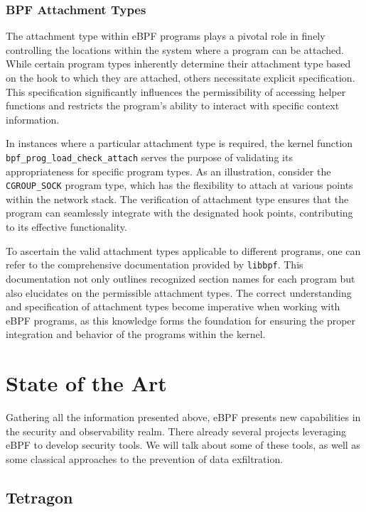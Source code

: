 \subsubsection{BPF Attachment Types}


The attachment type within eBPF programs plays a pivotal role in finely controlling the locations within the system where a program can be attached. While certain program types inherently determine their attachment type based on the hook to which they are attached, others necessitate explicit specification. This specification significantly influences the permissibility of accessing helper functions and restricts the program's ability to interact with specific context information.

In instances where a particular attachment type is required, the kernel function \texttt{bpf\_prog\_load\_check\_attach} serves the purpose of validating its appropriateness for specific program types. As an illustration, consider the \texttt{CGROUP\_SOCK} program type, which has the flexibility to attach at various points within the network stack. The verification of attachment type ensures that the program can seamlessly integrate with the designated hook points, contributing to its effective functionality.

To ascertain the valid attachment types applicable to different programs, one can refer to the comprehensive documentation provided by \texttt{libbpf}. This documentation not only outlines recognized section names for each program but also elucidates on the permissible attachment types. The correct understanding and specification of attachment types become imperative when working with eBPF programs, as this knowledge forms the foundation for ensuring the proper integration and behavior of the programs within the kernel.


\section{State of the Art}

Gathering all the information presented above, eBPF presents new capabilities in  the security and observability realm. There already several projects leveraging eBPF to develop security tools.
We will talk about some of these tools, as well as some classical approaches to the prevention of data exfiltration. 

\subsection{Tetragon}

